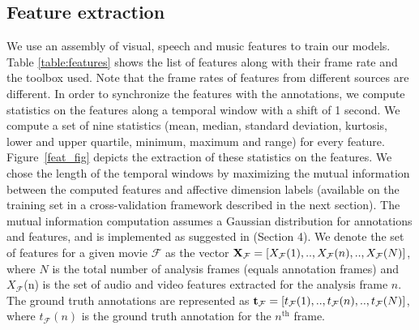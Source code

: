 \documentclass{article}
\begin{document}
\begin{spacing}{0.9}
\vspace{-2mm}
\subsection{Feature extraction} \label{feature_extraction}
\vspace{-2mm}
We use an assembly of visual, speech and music features to train our models.
Table \ref{table:features} shows the list of features along with their frame rate and the toolbox used. 
Note that the frame rates of features from different sources are different.
In order to synchronize the features with the annotations, we compute statistics on the features along a temporal window with a shift of 1 second. 
We compute a set of nine statistics (mean, median, standard deviation, kurtosis, lower and upper quartile, minimum, maximum and range) for every feature. 
Figure~\ref{feat_fig} depicts the extraction of these statistics on the features.
We chose the length of the temporal windows by maximizing the mutual information between the computed features and affective dimension labels (available on the training set in a cross-validation framework described in the next section).
The mutual information computation assumes a Gaussian distribution for annotations and features, and is implemented as suggested in \cite{mariooryad2015correcting} (Section 4). 
We denote the set of features for a given movie $\mathcal{F}$ as the vector ${\bf X}_{\mathcal{F}} = [X_{\mathcal{F}}(1), .., X_{\mathcal{F}}(n), .., X_{\mathcal{F}}(N) ]$, where $N$ is the total number of analysis frames (equals annotation frames) and $X_{\mathcal{F}}$(n) is the set of audio and video features extracted for the analysis frame $n$.
The ground truth annotations are represented as ${\bf t}_{\mathcal F} = [t_\mathcal F(1), .., t_\mathcal F(n), .., t_\mathcal F(N)]$, where $t_\mathcal F(n)$ is the ground truth annotation for the $n^\text{th}$ frame. 


\end{spacing}
\end{document}
